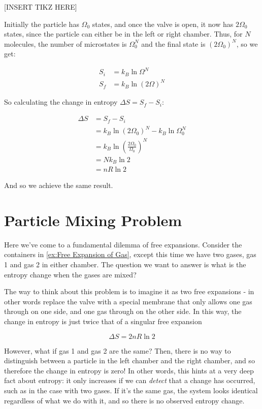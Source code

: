 [INSERT TIKZ HERE]

Initially the particle has $\Omega_0$ states, and once the valve is open, it now has $2\Omega_0$ states, since the particle can either be in the left or right chamber. Thus, for $N$ molecules, the number of microstates is $\Omega_0^N$ and the final state is $(2\Omega_0)^N$, so we get:

\begin{align*}
    S_i &= k_B \ln \Omega^N\\
    S_f &= k_B \ln (2 \Omega)^N
\end{align*}

So calculating the change in entropy $\Delta S = S_f - S_i$: 

\begin{align*}
    \Delta S &= S_f - S_i\\
    &= k_B \ln (2\Omega_0)^N - k_B \ln \Omega_0^N\\
    &= k_B \ln \left(\frac{2 \Omega_0}{\Omega_0}\right)^N\\
    &= Nk_B \ln 2\\
    &= nR \ln 2
\end{align*}

And so we achieve the same result. 

\section{Particle Mixing Problem} 

Here we've come to a fundamental dilemma of free expansions. Consider the containers in \ref{ex:Free Expansion of Gas}, except this time we have two gases, gas 1 and gas 2 in either chamber. The question we want to answer is what is the entropy change when the gases are mixed? 

The way to think about this problem is to imagine it as two free expansions - in other words replace the valve with a special membrane that only allows one gas through on one side, and one gas through on the other side. In this way, the change in entropy is just twice that of a singular free expansion

\[ \Delta S = 2nR \ln 2\]

However, what if gas 1 and gas 2 are the same? Then, there is no way to distinguish between a particle in the left chamber and the right chamber, and so therefore the change in entropy is zero! In other words, this hints at a very deep fact about entropy: it only increases if we can \textit{detect} that a change has occurred, such as in the case with two gases. If it's the same gas, the system looks identical regardless of what we do with it, and so there is no observed entropy change.
